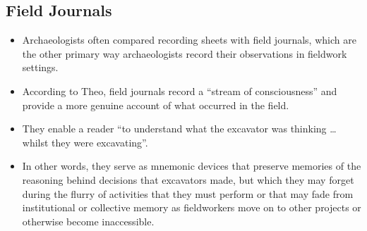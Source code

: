 \documentclass{article}
\begin{document}
\subsection{Field Journals}
\begin{itemize}
  \item Archaeologists often compared recording sheets with field journals, which are the other primary way archaeologists record their observations in fieldwork settings.

  \item According to Theo, field journals record a “stream of consciousness” and provide a more genuine account of what occurred in the field.
  \item They enable a reader “to understand what the excavator was thinking … whilst they were excavating”.
  \item In other words, they serve as mnemonic devices that preserve memories of the reasoning behind decisions that excavators made, but which they may forget during the flurry of activities that they must perform or that may fade from institutional or collective memory as fieldworkers move on to other projects or otherwise become inaccessible.
  

\end{itemize}
\end{document}
